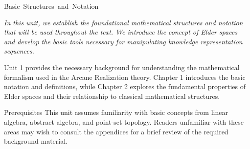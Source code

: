 
\unit{Basic Structures and Notation}

\begin{center}
\textit{In this unit, we establish the foundational mathematical structures and notation that will be used throughout the text. We introduce the concept of Elder spaces and develop the basic tools necessary for manipulating knowledge representation sequences.}
\end{center}

\vspace{1cm}

\begin{chaptersummary}
Unit 1 provides the necessary background for understanding the mathematical formalism used in the Arcane Realization theory. Chapter 1 introduces the basic notation and definitions, while Chapter 2 explores the fundamental properties of Elder spaces and their relationship to classical mathematical structures.
\end{chaptersummary}

\vspace{1cm}

\begin{advancedtopic}{Prerequisites}
This unit assumes familiarity with basic concepts from linear algebra, abstract algebra, and point-set topology. Readers unfamiliar with these areas may wish to consult the appendices for a brief review of the required background material.
\end{advancedtopic}
